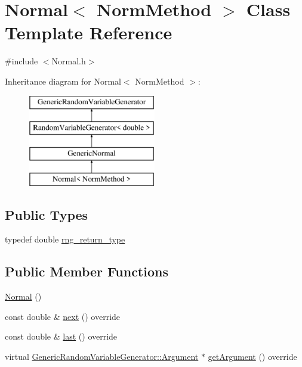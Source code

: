 \hypertarget{class_normal}{}\section{Normal$<$ Norm\+Method $>$ Class Template Reference}
\label{class_normal}


{\ttfamily \#include $<$Normal.\+h$>$}

Inheritance diagram for Normal$<$ Norm\+Method $>$\+:\begin{figure}[H]
\begin{center}
\leavevmode
\includegraphics[height=4.000000cm]{class_normal}
\end{center}
\end{figure}
\subsection*{Public Types}
\begin{DoxyCompactItemize}
\item 
typedef double \hyperlink{class_normal_a32c30c2173a87e48270b909d9f9be06e}{rng\+\_\+return\+\_\+type}
\end{DoxyCompactItemize}
\subsection*{Public Member Functions}
\begin{DoxyCompactItemize}
\item 
\hyperlink{class_normal_abd6aa5f1a9d1619ad8db2600e11e795e}{Normal} ()
\item 
const double \& \hyperlink{class_normal_a2cd9c31195181491a4bf0d3856746437}{next} () override
\item 
const double \& \hyperlink{class_normal_a3f10787d08cb2479764d7e0da8256aa7}{last} () override
\item 
virtual \hyperlink{class_generic_random_variable_generator_1_1_argument}{Generic\+Random\+Variable\+Generator\+::\+Argument} $\ast$ \hyperlink{class_normal_ac4048e25ff218cfb6052bd1b022b1591}{get\+Argument} () override
\end{DoxyCompactItemize}
